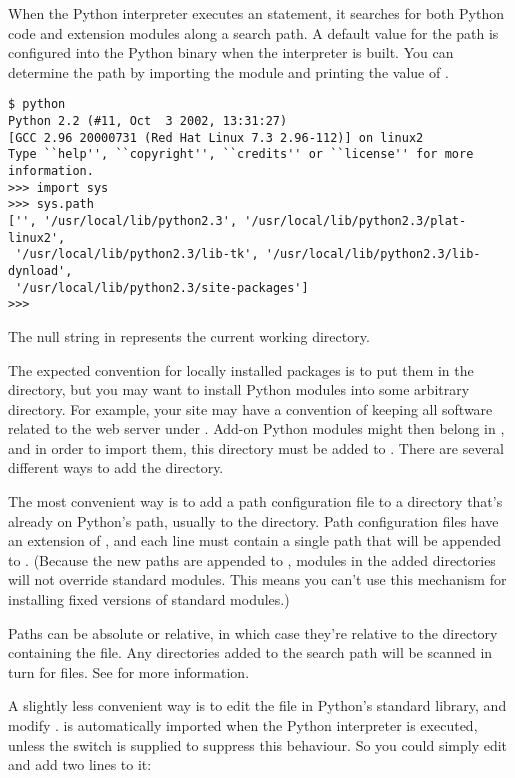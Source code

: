 \documentclass{howto}
\begin{document}
When the Python interpreter executes an  statement, it
searches for both Python code and extension modules along a search
path.  A default value for the path is configured into the Python
binary when the interpreter is built.  You can determine the path by
importing the  module and printing the value of
.  

\begin{verbatim}
$ python
Python 2.2 (#11, Oct  3 2002, 13:31:27)
[GCC 2.96 20000731 (Red Hat Linux 7.3 2.96-112)] on linux2
Type ``help'', ``copyright'', ``credits'' or ``license'' for more information.
>>> import sys
>>> sys.path
['', '/usr/local/lib/python2.3', '/usr/local/lib/python2.3/plat-linux2', 
 '/usr/local/lib/python2.3/lib-tk', '/usr/local/lib/python2.3/lib-dynload', 
 '/usr/local/lib/python2.3/site-packages']
>>>
\end{verbatim} %

The null string in  represents the current working
directory.   

The expected convention for locally installed packages is to put them
in the  directory, but you may want to
install Python modules into some arbitrary directory.  For example,
your site may have a convention of keeping all software related to the
web server under .  Add-on Python modules might then belong
in , and in order to import them, this directory
must be added to .  There are several different ways to
add the directory.

The most convenient way is to add a path configuration file to a
directory that's already on Python's path, usually to the
 directory.  Path configuration files have an
extension of , and each line must contain a single path
that will be appended to .  (Because the new paths are
appended to , modules in the added directories will not
override standard modules.  This means you can't use this mechanism
for installing fixed versions of standard modules.)

Paths can be absolute or relative, in which case they're relative to
the directory containing the  file.  Any directories added
to the search path will be scanned in turn for  files.  See
 for more information.

A slightly less convenient way is to edit the  file in
Python's standard library, and modify .  
is automatically imported when the Python interpreter is executed,
unless the  switch is supplied to suppress this
behaviour.  So you could simply edit  and add two lines to it:
\end{document}
